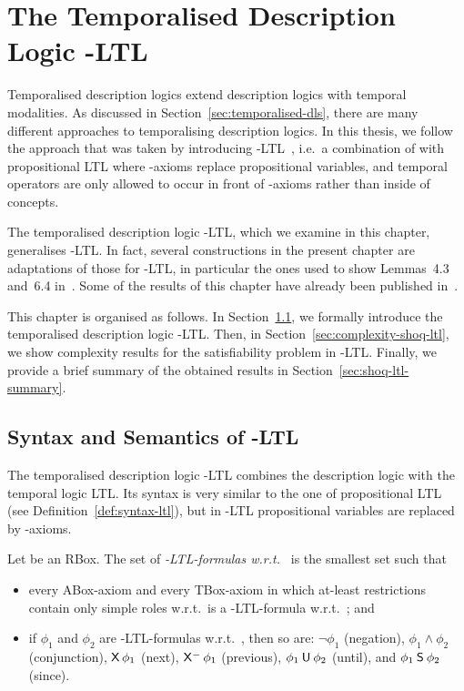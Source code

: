\chapter{The Temporalised Description Logic \texorpdfstring{\SHOQ-LTL}{SHOQ-LTL}}\label{ch:shoq-ltl}

Temporalised description logics extend description logics with temporal
modalities.  As discussed in Section~\ref{sec:temporalised-dls}, there are
many different approaches to temporalising description logics.  In this thesis,
we follow the approach that was taken by introducing
\ALC-LTL~\cite{BaGL-ToCL12}, i.e.~a combination of \ALC with propositional LTL
where \ALC-axioms replace propositional variables, and temporal operators are
only allowed to occur in front of \ALC-axioms rather than inside of concepts.

The temporalised description logic \SHOQ-LTL, which we examine in this chapter,
generalises \ALC-LTL\@.  In fact, several constructions in the present chapter
are adaptations of those for \ALC-LTL, in particular the ones used to show
Lemmas~4.3 and~6.4 in~\cite{BaGL-ToCL12}.
%
Some of the results of this chapter have already been published
in~\cite{BaLi-LTCS-14-01}.

This chapter is organised as follows.  In
Section~\ref{sec:syntax-semantics-shoq-ltl}, we formally introduce the
temporalised description logic \SHOQ-LTL\@.  Then, in
Section~\ref{sec:complexity-shoq-ltl}, we show complexity results for the
satisfiability problem in \SHOQ-LTL\@.  Finally, we provide a brief summary of
the obtained results in Section~\ref{sec:shoq-ltl-summary}.


\section{Syntax and Semantics of \texorpdfstring{\SHOQ-LTL}{SHOQ-LTL}}\label{sec:syntax-semantics-shoq-ltl}

The temporalised description logic \SHOQ-LTL combines the description logic
\SHOQ with the temporal logic LTL\@.  Its syntax is very similar to the one of
propositional LTL (see Definition~\ref{def:syntax-ltl}), but in \SHOQ-LTL
propositional variables are replaced by \SHOQ-axioms.

\begin{definition}
    Let \Rmc be an RBox.  The set of \emph{\SHOQ-LTL-formulas w.r.t.~\Rmc} is the smallest
    set such that
    \begin{itemize}
        \item every ABox-axiom and every TBox-axiom in which at-least
            restrictions contain only simple roles w.r.t.~\Rmc is a
            \SHOQ-LTL-formula w.r.t.~\Rmc; and
        \item if $\phi_1$ and $\phi_2$ are \SHOQ-LTL-formulas w.r.t.~\Rmc, then
            so are: $\lnot\phi_1$ (negation), $\phi_1\land\phi_2$ (conjunction),
            $\operatorname{\mathsf{X}}\phi_1$ (next), $\Previous\phi_1$ (previous),
            $\phi_1\mathbin{\mathsf{U}}\phi_2$ (until), and $\phi_1\mathbin{\mathsf{S}}\phi_2$ (since).
    \end{itemize}
\end{definition}

